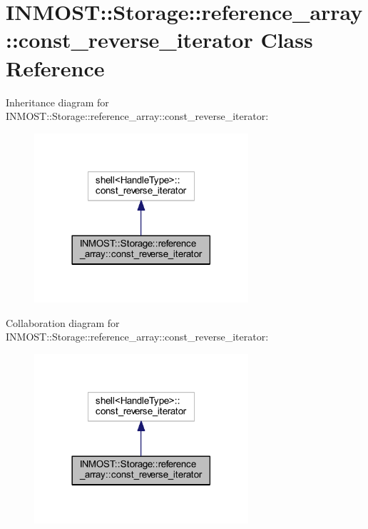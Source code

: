 \hypertarget{classINMOST_1_1Storage_1_1reference__array_1_1const__reverse__iterator}{\section{I\-N\-M\-O\-S\-T\-:\-:Storage\-:\-:reference\-\_\-array\-:\-:const\-\_\-reverse\-\_\-iterator Class Reference}
\label{classINMOST_1_1Storage_1_1reference__array_1_1const__reverse__iterator}
}


Inheritance diagram for I\-N\-M\-O\-S\-T\-:\-:Storage\-:\-:reference\-\_\-array\-:\-:const\-\_\-reverse\-\_\-iterator\-:
\nopagebreak
\begin{figure}[H]
\begin{center}
\leavevmode
\includegraphics[width=225pt]{classINMOST_1_1Storage_1_1reference__array_1_1const__reverse__iterator__inherit__graph}
\end{center}
\end{figure}


Collaboration diagram for I\-N\-M\-O\-S\-T\-:\-:Storage\-:\-:reference\-\_\-array\-:\-:const\-\_\-reverse\-\_\-iterator\-:
\nopagebreak
\begin{figure}[H]
\begin{center}
\leavevmode
\includegraphics[width=225pt]{classINMOST_1_1Storage_1_1reference__array_1_1const__reverse__iterator__coll__graph}
\end{center}
\end{figure}
